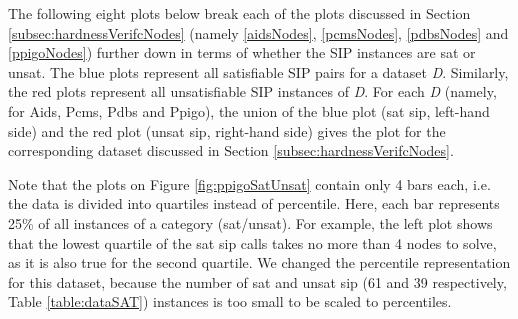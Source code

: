 \documentclass{l4proj}
\newcounter{example}[section]
\begin{document}
The following eight plots below break each of the plots discussed in Section \ref{subsec:hardnessVerifcNodes} (namely \ref{aidsNodes}, \ref{pcmsNodes}, \ref{pdbsNodes} and \ref{ppigoNodes}) further down in terms of whether the SIP instances are \gls{sat} or \gls{unsat}. The blue plots represent all satisfiable SIP pairs for a dataset \emph{D}. Similarly, the red plots represent all unsatisfiable SIP instances of \emph{D}. For each \emph{D} (namely, for Aids, Pcms, Pdbs and Ppigo), the union of the blue plot (\gls{sat} \gls{sip}, left-hand side) and the red plot (\gls{unsat} \gls{sip}, right-hand side) gives the plot for the corresponding dataset discussed in Section \ref{subsec:hardnessVerifcNodes}.

Note that the plots on Figure \ref{fig:ppigoSatUnsat} contain only 4 bars each, i.e. the data is divided into quartiles instead of percentile. Here, each bar represents 25\% of all instances of a category (\gls{sat}/\gls{unsat}). For example, the left plot shows that the lowest quartile of the \gls{sat} \gls{sip} calls takes no more than 4 nodes to solve, as it is also true for the second quartile. We changed the percentile representation for this dataset, because the number of \gls{sat} and \gls{unsat} \gls{sip} (61 and 39 respectively, Table \ref{table:dataSAT}) instances is too small to be scaled to percentiles.
\end{document}
